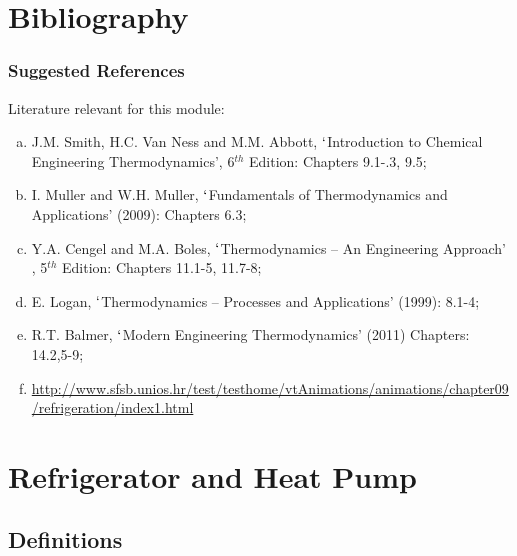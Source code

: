 \documentclass[10pt,compress,handout,ignorenonframetext]{beamer}
\begin{document}
\section{Bibliography} 
\begin{frame}
 \frametitle{Suggested References}
  Literature relevant for this module:
  \begin{enumerate}[(a)]
   \item J.M. Smith, H.C. Van Ness and M.M. Abbott, $\lq$Introduction to Chemical Engineering Thermodynamics', 6$^{th}$ Edition: Chapters 9.1-.3, 9.5;
   \item I. Muller and W.H. Muller, $\lq$Fundamentals of Thermodynamics and Applications' (2009): Chapters 6.3;
   \item Y.A. Cengel and M.A. Boles, $\lq$Thermodynamics -- An Engineering Approach' , 5$^{th}$ Edition: Chapters 11.1-5, 11.7-8;
   \item E. Logan, $\lq$Thermodynamics -- Processes and Applications' (1999): 8.1-4;
   \item R.T. Balmer, $\lq$Modern Engineering Thermodynamics' (2011) Chapters: 14.2,5-9;
   \item \href{http://www.sfsb.unios.hr/test/testhome/vtAnimations/animations/chapter09/refrigeration/index1.html}{\tiny{http://www.sfsb.unios.hr/test/testhome/vtAnimations/animations/chapter09/refrigeration/index1.html}}
  \end{enumerate}
\end{frame}



\section{Refrigerator and Heat Pump}

\subsection{Definitions}
\end{document}
